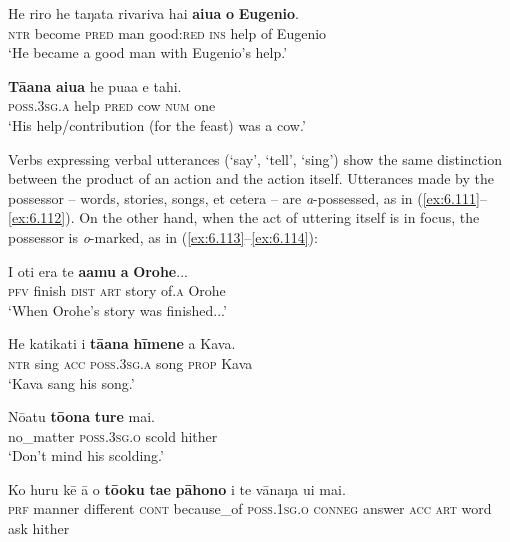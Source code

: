 \ea\label{ex:6.109}
\gll He riro he taŋata rivariva hai \textbf{{\ꞌ}aiua} \textbf{o} \textbf{Eugenio}. \\
\textsc{ntr} become \textsc{pred} man good:\textsc{red} \textsc{ins} help of Eugenio \\

\glt 
‘He became a good man with Eugenio’s help.’ \textstyleExampleref{[R231.316]} 
\z

\ea\label{ex:6.110}
\gll \textbf{Tā{\ꞌ}ana} \textbf{{\ꞌ}aiua} he pua{\ꞌ}a e tahi. \\
\textsc{poss.3sg.a} help \textsc{pred} cow \textsc{num} one \\

\glt
‘His help/contribution (for the feast) was a cow.’ \textstyleExampleref{[Notes]}
\z

Verbs expressing verbal utterances (‘say’, ‘tell’, ‘sing’) show the same distinction between the product of an action and the action itself. Utterances made by the possessor – words, stories, songs, et cetera – are \textit{a}{}-possessed, as in (\ref{ex:6.111}–\ref{ex:6.112}). On the other hand, when the act of uttering itself is in focus, the possessor is \textit{o}{}-marked, as in (\ref{ex:6.113}–\ref{ex:6.114}):

\ea\label{ex:6.111}
\gll I oti era te \textbf{{\ꞌ}a{\ꞌ}amu} \textbf{{\ꞌ}a} \textbf{{\ꞌ}Orohe}... \\
\textsc{pfv} finish \textsc{dist} \textsc{art} story of\textsc{.a} Orohe \\

\glt 
‘When Orohe’s story was finished...’ \textstyleExampleref{[R334.249]} 
\z

\ea\label{ex:6.112}
\gll He katikati i \textbf{tā{\ꞌ}ana} \textbf{hīmene} a Kava. \\
\textsc{ntr} sing \textsc{acc} \textsc{poss.3sg.a} song \textsc{prop} Kava \\

\glt 
‘Kava sang his song.’ \textstyleExampleref{[R229.158]} 
\z

\ea\label{ex:6.113}
\gll Nōatu \textbf{tō{\ꞌ}ona} \textbf{ture} mai. \\
no\_matter \textsc{poss.3sg.o} scold hither \\

\glt 
‘Don’t mind his scolding.’ \textstyleExampleref{[Egt-02.184]}
\z

\ea\label{ex:6.114}
\gll Ko huru kē {\ꞌ}ā {\ꞌ}o \textbf{tō{\ꞌ}oku} \textbf{ta{\ꞌ}e} \textbf{pāhono} i te  vānaŋa {\ꞌ}ui mai.\\
\textsc{prf} manner different \textsc{cont} because\_of \textsc{poss.1sg.o} \textsc{conneg} answer \textsc{acc} \textsc{art}  word ask hither\\

